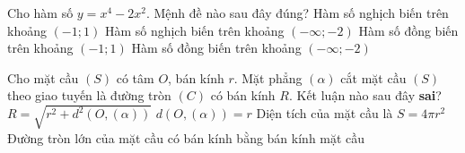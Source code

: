 \begin{ex}%
Cho hàm số  $y=x^4-2x^2$. Mệnh đề nào sau đây đúng?
	\choice
	{Hàm số nghịch biến trên khoảng $(-1;1)$}
	{\True Hàm số nghịch biến trên khoảng $(-\infty;-2)$}
{Hàm số đồng biến trên khoảng $(-1;1)$}
	{Hàm số đồng biến trên khoảng $(-\infty;-2)$}
\end{ex}
\begin{ex}%
	Cho mặt cầu $(S)$  có tâm  $O$, bán kính  $r$. Mặt phẳng $(\alpha)$  cắt mặt cầu $(S)$  theo giao tuyến là đường tròn $(C)$  có bán kính  $R$. Kết luận nào sau đây \textbf{sai}?
	\choice
	{\True $R=\sqrt{r^2+d^2(O,(\alpha))}$}
	{$d(O,(\alpha))=r$}
	{Diện tích của mặt cầu là  $S=4\pi r^2$}
	{Đường tròn lớn của mặt cầu có bán kính bằng bán kính mặt cầu}
\end{ex}

